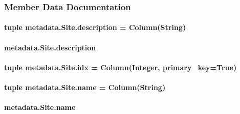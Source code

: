 \subsubsection{Member Data Documentation}
\hypertarget{classmetadata_1_1Site_a56982a2be26744b4a006685ea809a154}{
\paragraph[{description}]{\setlength{\rightskip}{0pt plus 5cm}tuple metadata.\-Site.\-description = Column(String)\hspace{0.3cm}{\ttfamily [static]}}}\label{classmetadata_1_1Site_a56982a2be26744b4a006685ea809a154}
\hypertarget{classmetadata_1_1Site_a3e551cc113158cbba76735db9d6ce6b5}{
\paragraph[{description}]{\setlength{\rightskip}{0pt plus 5cm}metadata.\-Site.\-description}}\label{classmetadata_1_1Site_a3e551cc113158cbba76735db9d6ce6b5}
\hypertarget{classmetadata_1_1Site_a94c96d07409fa6b66df5ebd5b8e5027b}{
\paragraph[{idx}]{\setlength{\rightskip}{0pt plus 5cm}tuple metadata.\-Site.\-idx = Column(Integer, primary\-\_\-key=True)\hspace{0.3cm}{\ttfamily [static]}}}\label{classmetadata_1_1Site_a94c96d07409fa6b66df5ebd5b8e5027b}
\hypertarget{classmetadata_1_1Site_a2d6fc6941f3ae18007ecfc802e82c912}{
\paragraph[{name}]{\setlength{\rightskip}{0pt plus 5cm}tuple metadata.\-Site.\-name = Column(String)\hspace{0.3cm}{\ttfamily [static]}}}\label{classmetadata_1_1Site_a2d6fc6941f3ae18007ecfc802e82c912}
\hypertarget{classmetadata_1_1Site_a3c1394a5dc75c64eadf4effd1600559e}{
\paragraph[{name}]{\setlength{\rightskip}{0pt plus 5cm}metadata.\-Site.\-name}}\label{classmetadata_1_1Site_a3c1394a5dc75c64eadf4effd1600559e}
